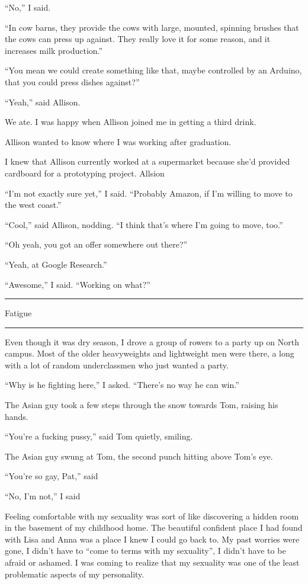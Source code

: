 ``No,'' I said.

``In cow barns, they provide the cows with large, mounted, spinning brushes that
the cows can press up against.  They really love it for some reason, and it
increases milk production.''

``You mean we could create something like that, maybe controlled by an Arduino,
that you could press dishes against?''

``Yeah,'' said Allison.

We ate.  I was happy when Allison joined me in getting a third drink.

Allison wanted to know where I was working after graduation.

I knew that Allison currently worked at a supermarket because she'd provided
cardboard for a prototyping project.  Allsion 

``I'm not exactly sure yet,'' I said.  ``Probably Amazon, if I'm willing to move
to the west coast.''

``Cool,'' said Allison, nodding.  ``I think that's where I'm going to move,
too.''

``Oh yeah, you got an offer somewhere out there?''

``Yeah, at Google Research.''

``Awesome,'' I said.  ``Working on what?''

\plainfancybreak{12pt}{2}{* * *}

Fatigue

\plainfancybreak{12pt}{2}{* * *}

Even though it was dry season, I drove a group of rowers to a party up on North
campus.  Most of the older heavyweights and lightweight men were there, a long
with a lot of random underclassmen who just wanted a party.

``Why is he fighting here,'' I asked.  ``There's no way he can win.'' 

The Asian guy took a few steps through the snow towards Tom, raising his hands.

``You're a fucking pussy,'' said Tom quietly, smiling. 

The Asian guy swung at Tom, the second punch hitting above Tom's eye.

``You're so gay, Pat,'' said 

``No, I'm not,'' I said

Feeling comfortable with my sexuality was sort of like discovering a hidden room
in the basement of my childhood home.  The beautiful confident place I had found
with Lisa and Anna was a place I knew I could go back to.  My past worries were
gone, I didn't have to ``come to terms with my sexuality'', I didn't have to be
afraid or ashamed.  I was coming to realize that my sexuality was one of the
least problematic aspects of my personality.
 
